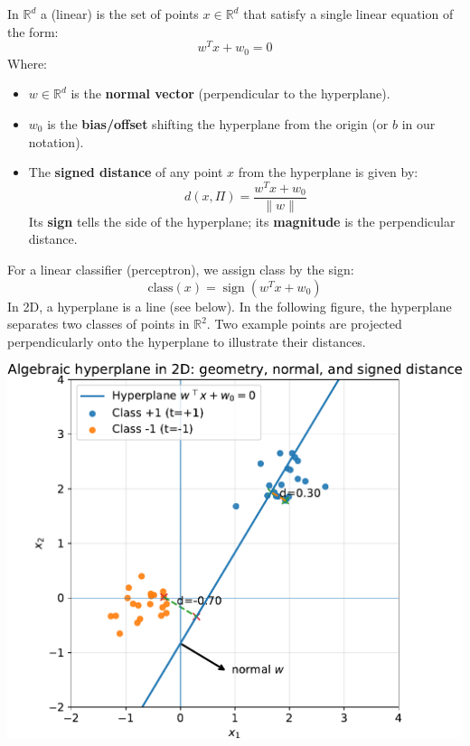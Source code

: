 \highspace
\begin{remarkbox}
    In $\mathbb{R}^{d}$ a (linear)  is the set of points $x \in \mathbb{R}^{d}$ that satisfy a single linear equation of the form:
    \begin{equation*}
        w^{T} x + w_0 = 0
    \end{equation*}
    Where:
    \begin{itemize}
        \item $w \in \mathbb{R}^{d}$ is the \textbf{normal vector} (perpendicular to the hyperplane).
        \item $w_{0}$ is the \textbf{bias/offset} shifting the hyperplane from the origin (or $b$ in our notation).
        \item The \textbf{signed distance} of any point $x$ from the hyperplane is given by:
        \begin{equation*}
            d\left(x, \Pi\right) = \dfrac{w^{T} x + w_{0}}{\lVert w \rVert}
        \end{equation*}
        Its \textbf{sign} tells the side of the hyperplane; its \textbf{magnitude} is the perpendicular distance.
    \end{itemize}
    For a linear classifier (perceptron), we assign class by the sign:
    \begin{equation*}
        \text{class}(x) = \operatorname{sign}\left(w^{T} x + w_0\right)
    \end{equation*}
    In 2D, a hyperplane is a line (see below). In the following figure, the hyperplane separates two classes of points in $\mathbb{R}^{2}$. Two example points are projected perpendicularly onto the hyperplane to illustrate their distances.
    \begin{center}
        \includegraphics[width=\textwidth]{img/perceptron/hyperplane.pdf}
    \end{center}
\end{remarkbox}


